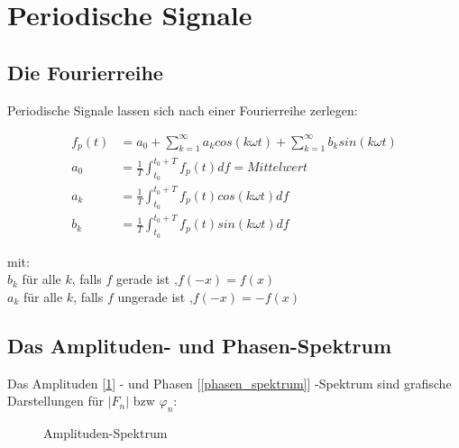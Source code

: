 \documentclass[a4paper,10pt]{article}
\begin{document}
\newpage
\section{Periodische Signale}
\subsection{Die Fourierreihe}

Periodische Signale lassen sich nach einer Fourierreihe zerlegen:

\begin{align}
 f_p(t)&=a_0+\sum_{k=1}^\infty a_k cos(k\omega t)+ \sum_{k=1}^\infty b_k sin(k\omega t)\\
 a_0 &= \frac{1}{T} \int_{t_0}^{t_0+T} f_p(t) df = Mittelwert \\
 a_k &= \frac{1}{T} \int_{t_0}^{t_0+T} f_p(t) cos(k\omega t) df \\
 b_k &= \frac{1}{T} \int_{t_0}^{t_0+T} f_p(t) sin(k\omega t) df
\end{align}

mit:\\
$b_k$ für alle $k$, falls $f$ gerade ist ,$f(-x)=f(x)$\\
$a_k$ für alle $k$, falls $f$ ungerade ist ,$f(-x)=-f(x)$\\

\subsection{Das Amplituden- und Phasen-Spektrum}

Das Amplituden [\ref{amplituden_spektrum}] - und Phasen [\ref{phasen_spektrum}] -Spektrum sind grafische Darstellungen für $|F_n|$ bzw $\varphi_n$:

\begin{figure}[!htb]
\centering
{}
\caption{Amplituden-Spektrum}
\label{amplituden_spektrum}
\end{figure}
\end{document}

